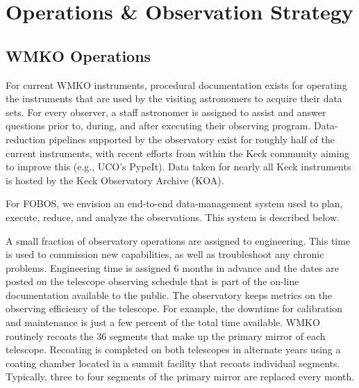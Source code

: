 \documentclass[oneside,11pt]{amsart}
\begin{document}
\section{Operations \& Observation Strategy}
\label{sec:ops}


\subsection{WMKO Operations}

For current WMKO instruments, procedural documentation exists for
operating the instruments that are used by the visiting astronomers
to acquire their data sets. For every observer, a staff astronomer is
assigned to assist and answer questions prior to, during, and after
executing their observing program. Data-reduction pipelines supported
by the observatory exist for roughly half of the current instruments,
with recent efforts from within the Keck community aiming to improve
this (e.g., UCO's PypeIt). Data taken for nearly all Keck instruments
is hosted by the Keck Observatory Archive (KOA).

For FOBOS, we envision an end-to-end data-management system used to
plan, execute, reduce, and analyze the observations. This system is
described below.

A small fraction of observatory operations are assigned to
engineering. This time is used to commission new capabilities, as
well as troubleshoot any chronic problems. Engineering time is
assigned 6 months in advance and the dates are posted on the
telescope observing schedule that is part of the on-line
documentation available to the public. The observatory keeps metrics
on the observing efficiency of the telescope. For example, the
downtime for calibration and maintenance is just a few percent of the
total time available. WMKO routinely recoats the 36 segments that
make up the primary mirror of each telescope. Recoating is completed
on both telescopes in alternate years using a coating chamber located
in a summit facility that recoats individual segments. Typically,
three to four segments of the primary mirror are replaced every
month.
\end{document}
